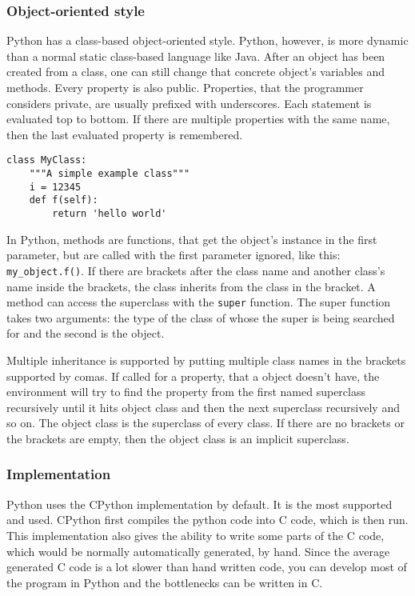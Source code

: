 \subsubsection{Object-oriented style}
Python has a class-based object-oriented style. Python, however, is more dynamic than a normal static class-based language like Java. After an object has been created from a class, one can still change that concrete object's variables and methods. Every property is also public. Properties, that the programmer considers private, are usually prefixed with underscores. Each statement is evaluated top to bottom. If there are multiple properties with the same name, then the last evaluated property is remembered.
\begin{verbatim}
class MyClass:
    """A simple example class"""
    i = 12345
    def f(self):
        return 'hello world'
\end{verbatim}
In Python, methods are functions, that get the object's instance in the first parameter, but are called with the first parameter ignored, like this: \verb;my_object.f();. If there are brackets after the class name and another class's name inside the brackets, the class inherits from the class in the bracket. A method can access the superclass with the \verb;super; function. The super function takes two arguments: the type of the class of whose the super is being searched for and the second is the object.

Multiple inheritance is supported by putting multiple class names in the brackets supported by comas. If called for a property, that a object doesn't have, the environment will try to find the property from the first named superclass recursively until it hits object class and then the next superclass recursively and so on. The object class is the superclass of every class. If there are no brackets or the brackets are empty, then the object class is an implicit superclass.

\subsubsection{Implementation}
Python uses the CPython implementation by default. It is the most supported and
used. CPython first compiles the python code into C code, which is then run.
This implementation also gives the ability to write some parts of the C code,
which would be normally automatically generated, by hand. Since the average
generated C code is a lot slower than hand written code, you can develop most of
the program in Python and the bottlenecks can be written in C.

